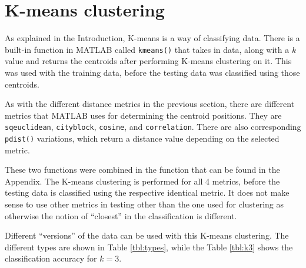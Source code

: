\documentclass[a4paper, 10pt, conference]{ieeeconf}
\begin{document}
\section{K-means clustering}

As explained in the Introduction, K-means is a way of classifying data. There is a built-in function in MATLAB called \texttt{kmeans()} that takes in data, along with a $k$ value and returns the centroids after performing K-means clustering on it. This was used with the training data, before the testing data was classified using those centroids.

As with the different distance metrics in the previous section, there are different metrics that MATLAB uses for determining the centroid positions. They are \texttt{sqeuclidean}, \texttt{cityblock}, \texttt{cosine}, and \texttt{correlation}. There are also corresponding \texttt{pdist()} variations, which return a distance value depending on the selected metric.

These two functions were combined in the function that can be found in the Appendix. The K-means clustering is performed for all 4 metrics, before the testing data is classified using the respective identical metric. It does not make sense to use other metrics in testing other than the one used for clustering as otherwise the notion of ``closest'' in the classification is different.

Different ``versions'' of the data can be used with this K-means clustering. The different types are shown in Table \ref{tbl:types}, while the Table \ref{tbl:k3} shows the classification accuracy for $k=3$.

\end{document}
